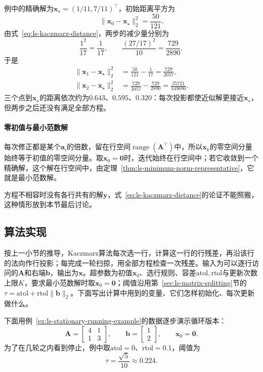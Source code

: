 例中的精确解为$\bm x_\star=(1/11,7/11)^\top$，初始距离平方为
\[
 \lVert\bm x_0-\bm x_\star\rVert_2^2=\frac{50}{121}.
\]
由式~\eqref{eq:ls-kaczmarz-distance}，两步的减少量分别为
\[
 \frac{1^2}{17}=\frac1{17},\qquad \frac{(27/17)^2}{10}=\frac{729}{2890},
\]
于是
\[
 \begin{aligned}
 \lVert\bm x_1-\bm x_\star\rVert_2^2&=\frac{50}{121}-\frac1{17}=\frac{729}{2057},\\
 \lVert\bm x_2-\bm x_\star\rVert_2^2&=\frac{729}{2057}-\frac{729}{2890}=\frac{35721}{349690}.
 \end{aligned}
\]
三个点到$\bm x_\star$的距离依次约为$0.643$、$0.595$、$0.320$：每次投影都使近似解更接近$\bm x_\star$，但两步之后还没有满足全部方程。

\paragraph{零初值与最小范数解}
每次修正都是某个$\bm a_i$的倍数，留在行空间$\operatorname{range}(\bm A^\top)$中，所以$\bm x_k$的零空间分量始终等于初值的零空间分量。取$\bm x_0=\bm0$时，迭代始终在行空间中；若它收敛到一个精确解，这个解在行空间中，由定理~\ref{thm:ls-minimum-norm-representative}，它就是最小范数解。

方程不相容时没有各行共有的解$\bm y$，式~\eqref{eq:ls-kaczmarz-distance}的论证不能照搬，这种情形放到本节最后讨论。

\subsection{算法实现}

按上一小节的推导，Kaczmarz算法每次选一行，计算这一行的行残差，再沿该行的法向作行投影；每完成一轮扫掠，用全部方程检查一次残差。输入为可以逐行访问的$\bm A$和右端$\bm b$，输出为$\bm x$。超参数为初值$\bm x_0$、选行规则、容差$\mathrm{atol},\mathrm{rtol}$与更新次数上限$K$，要求最小范数解时取$\bm x_0=\bm0$；阈值沿用第~\ref{sec:ls-matrix-splitting}节的$\tau=\mathrm{atol}+\mathrm{rtol}\lVert\bm b\rVert_2$。下面写出计算中用到的变量、它们怎样初始化、每次更新做什么。

下面用例~\ref{ex:ls-stationary-running-example}的数据逐步演示循环版本：
\[
 \bm A=\begin{bmatrix}4&1\\1&3\end{bmatrix},\qquad \bm b=\begin{bmatrix}1\\2\end{bmatrix},\qquad \bm x_0=\bm0 .
\]
为了在几轮之内看到停止，例中取$\mathrm{atol}=0$、$\mathrm{rtol}=0.1$，阈值为
\[
 \tau=\frac{\sqrt5}{10}\approx0.224 .
\]

